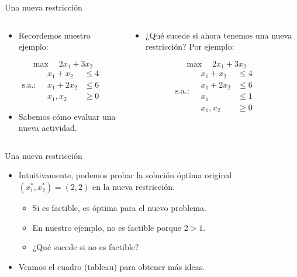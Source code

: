 \documentclass{beamer}
\begin{document}
\begin{frame}{Una nueva restricción}
\begin{columns}
\begin{column}{0.5\textwidth}
    \begin{itemize}
        \item Recordemos nuestro ejemplo:
    \end{itemize}

    \[
    \max \quad 2x_1 + 3x_2
    \]
    \[
    \text{s.a.:} \quad 
    \begin{aligned}
        x_1 + x_2 &\leq 4 \\
        x_1 + 2x_2 &\leq 6 \\
        x_1, x_2 &\geq 0
    \end{aligned}
    \]

    \begin{itemize}
        \item Sabemos cómo evaluar una nueva actividad.
    \end{itemize}
    \end{column}
    \begin{column}{0.5\textwidth}
    \begin{itemize}
        \item ¿Qué sucede si ahora tenemos una nueva restricción? Por ejemplo:
    \end{itemize}
    \[
    \max \quad 2x_1 + 3x_2
    \]
    \[
    \text{s.a.:} \quad 
    \begin{aligned}
        x_1 + x_2 &\leq 4 \\
        x_1 + 2x_2 &\leq 6 \\
        x_1 &\leq 1 \\
        x_1, x_2 &\geq 0
    \end{aligned}
    \] 
    \end{column}
    \end{columns}
\end{frame}

\begin{frame}{Una nueva restricción}
    \begin{itemize}
        \item Intuitivamente, podemos probar la solución óptima original \( (x_1^*, x_2^*) = (2, 2) \) en la nueva restricción.
        \begin{itemize}
            \item Si es factible, es óptima para el nuevo problema.
            \item En nuestro ejemplo, no es factible porque \( 2 > 1 \).
            \item ¿Qué sucede si no es factible?
        \end{itemize}
        
        \item Veamos el cuadro (tableau) para obtener más ideas.
    \end{itemize}
\end{frame}
\end{document}
